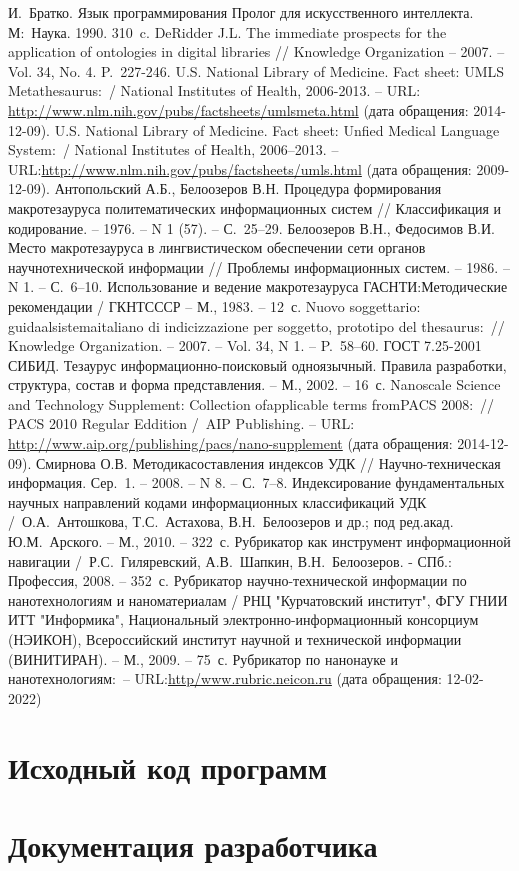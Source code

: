 \documentclass{studrep}
\begin{document}
\begin{thebibliography}{99}
 И.~Братко. Язык программирования Пролог для искусственного интеллекта. М\;:~Наука. 1990. 310~c.
 DeRidder J.L. The immediate prospects for the application of ontologies in digital libraries // Knowledge Organization -- 2007. -- Vol. 34, No. 4. P.~227-246.
  U.S. National Library of Medicine. Fact sheet: UMLS Metathesaurus\;:\;[текст]~/ National Institutes of Health, 2006-2013. -- URL:
\url{http://www.nlm.nih.gov/pubs/factsheets/umlsmeta.html} (дата обращения: 2014-12-09).
  U.S. National Library of Medicine. Fact sheet: Unfied Medical Language System\;:\;[текст]~/ National Institutes of Health, 2006--2013. -- URL:\url{http://www.nlm.nih.gov/pubs/factsheets/umls.html} (дата обращения: 2009-12-09).
  Антопольский А.Б., Белоозеров В.Н. Процедура формирования макротезауруса политематических информационных систем // Классификация и кодирование. -- 1976. -- N 1 (57). -- С.~25--29.
  Белоозеров В.Н., Федосимов В.И. Место макротезауруса в лингвистическом обеспечении сети органов научнотехнической информации // Проблемы информационных систем. -- 1986. -- N 1. -- С.~6--10.
  Использование и ведение макротезауруса ГАСНТИ:Методические рекомендации / ГКНТСССР -- М., 1983. -- 12~с.
  Nuovo soggettario: guidaalsistemaitaliano di indicizzazione per soggetto, prototipo del thesaurus\;:\;[рецензия]~// Knowledge Organization. -- 2007. -- Vol. 34, N 1. -- P.~58--60.
  ГОСТ 7.25-2001 СИБИД. Тезаурус информационно-поисковый одноязычный. Правила разработки, структура, состав и форма представления. -- М., 2002. -- 16~с.
  Nanoscale Science and Technology Supplement: Collection ofapplicable terms fromPACS 2008\;:\;[текст]~// PACS 2010 Regular Eddition /~AIP Publishing. -- URL: \url{http://www.aip.org/publishing/pacs/nano-supplement} (дата обращения: 2014-12-09).
  Смирнова О.В. Методикасоставления индексов УДК // Научно-техническая информация. Сер.~1. -- 2008. -- N 8. -- С.~7--8.
  Индексирование фундаментальных научных направлений кодами информационных классификаций УДК /~О.А.~Антошкова, Т.С.~Астахова, В.Н.~Белоозеров и др.; под ред.акад. Ю.М.~Арского. -- М., 2010. -- 322~с.
  Рубрикатор как инструмент информационной навигации /~Р.С.~Гиляревский, А.В.~Шапкин, В.Н.~Белоозеров. - СПб.\;: Профессия, 2008. -- 352~с.
  Рубрикатор научно-технической информации по нанотехнологиям и наноматериалам / РНЦ "Курчатовский институт",
ФГУ ГНИИ ИТТ "Информика", Национальный электронно-информационный консорциум (НЭИКОН), Всероссийский институт научной и технической информации (ВИНИТИРАН). -- М., 2009. -- 75~с.
  Рубрикатор по нанонауке и нанотехнологиям\;:\;[сайт]~-- URL:\url{http/www.rubric.neicon.ru} (дата обращения: 12-02-2022)
\end{thebibliography}

\appendices

\chapter{Исходный код программ}
\chapter{Документация разработчика}
\end{document}
